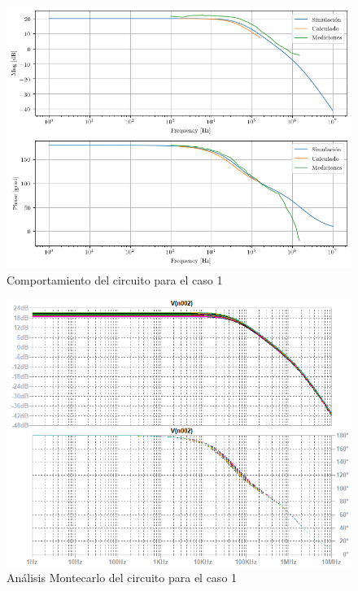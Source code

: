 \begin{figure}[H]
\begin{centering}
\includegraphics[scale=0.5]{../Ex1/iA/Resources1a/H1}
\par\end{centering}
\caption{Comportamiento del circuito para el caso 1}
\label{1_a_2}
\end{figure}

\begin{figure}[H]
\begin{centering}
\includegraphics[scale=0.5]{../Ex1/iA/Resources1a/montecarlo1a_1}
\par\end{centering}
\caption{Análisis Montecarlo del circuito para el caso 1}

\end{figure}

